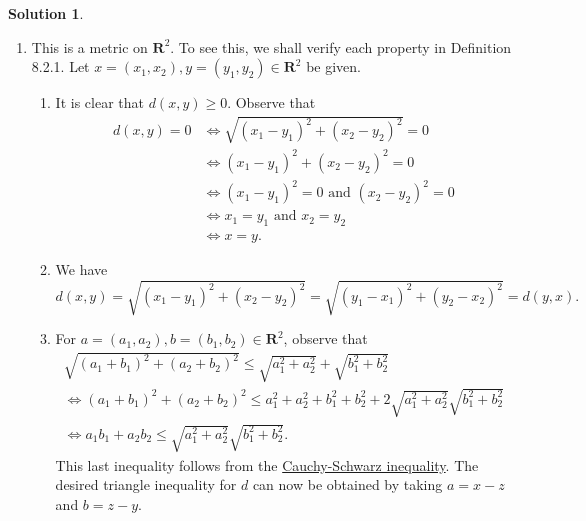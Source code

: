 \documentclass[12pt]{article}
\theoremstyle{definition}
\theoremstyle{exercise}
\theoremstyle{solution}
\newtheorem*{solution}{Solution}
\newcommand{\R}{\mathbf{R}}
\begin{document}
\begin{solution}
    \begin{enumerate}
        \item This is a metric on \( \R^2 \). To see this, we shall verify each property in Definition 8.2.1. Let \( x = (x_1, x_2), y = (y_1, y_2) \in \R^2 \) be given.
        \begin{enumerate}[label=(\roman*)]
            \item It is clear that \( d(x, y) \geq 0 \). Observe that
            \begin{align*}
                d(x, y) = 0 &\iff \sqrt{ (x_1 - y_1)^2 + (x_2 - y_2)^2 } = 0 \\[2mm]
                &\iff (x_1 - y_1)^2 + (x_2 - y_2)^2 = 0 \\[2mm]
                &\iff (x_1 - y_1)^2 = 0 \text{ and } (x_2 - y_2)^2 = 0 \\[2mm]
                &\iff x_1 = y_1 \text{ and } x_2 = y_2 \\[2mm]
                &\iff x = y.
            \end{align*}

            \item We have
            \[
                d(x, y) = \sqrt{ (x_1 - y_1)^2 + (x_2 - y_2)^2 } = \sqrt{ (y_1 - x_1)^2 + (y_2 - x_2)^2 } = d(y, x).
            \]

            \item For \( a = (a_1, a_2), b = (b_1, b_2) \in \R^2 \), observe that
            \begin{multline*}
                \sqrt{ (a_1 + b_1)^2 + (a_2 + b_2)^2 } \leq \sqrt{ a_1^2 + a_2^2 } + \sqrt{ b_1^2 + b_2^2 } \\[2mm]
                \iff (a_1 + b_1)^2 + (a_2 + b_2)^2 \leq a_1^2 + a_2^2 + b_1^2 + b_2^2 + 2 \sqrt{ a_1^2 + a_2^2 } \sqrt{ b_1^2 + b_2^2 } \\[2mm]
                \iff a_1 b_1 + a_2 b_2 \leq \sqrt{ a_1^2 + a_2^2 } \sqrt{ b_1^2 + b_2^2 }.
            \end{multline*}
            This last inequality follows from the \href{https://en.wikipedia.org/wiki/Cauchy%E2%80%93Schwarz_inequality#R2_-_The_plane}{Cauchy-Schwarz inequality}. The desired triangle inequality for \( d \) can now be obtained by taking \( a = x - z \) and \( b = z - y \).
        \end{enumerate}


\end{enumerate}
\end{solution}
\end{document}
